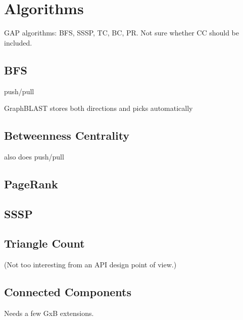 \section{Algorithms}
\label{sec:algorithms}

GAP algorithms: BFS, SSSP, TC, BC, PR. Not sure whether CC should be included.

\subsection{BFS}

push/pull~\cite{DBLP:conf/icpp/YangBO18}

GraphBLAST stores both directions and picks automatically~\cite{DBLP:journals/corr/abs-1908-01407}

\subsection{Betweenness Centrality}

also does push/pull

\subsection{PageRank}


\subsection{SSSP}

\subsection{Triangle Count}

(Not too interesting from an API design point of view.)

\subsection{Connected Components}

Needs a few GxB extensions.